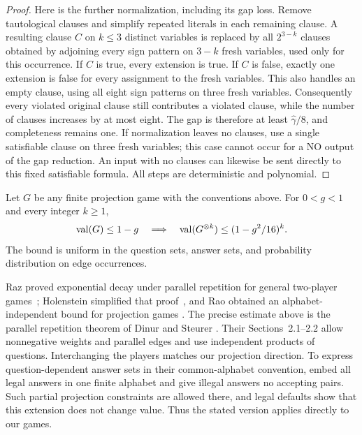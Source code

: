 \begin{proof}
Here is the further normalization, including its gap loss.  Remove
tautological clauses and simplify repeated literals in each remaining
clause.  A resulting clause $C$ on $k\leq3$ distinct variables is
replaced by all $2^{3-k}$ clauses obtained by adjoining every sign
pattern on $3-k$ fresh variables, used only for this occurrence.  If
$C$ is true, every extension is true.  If $C$ is false, exactly one
extension is false for every assignment to the fresh variables.
This also handles an empty clause, using all eight sign patterns on
three fresh variables.  Consequently every violated original clause
still contributes a violated clause, while the number of clauses
increases by at most eight.  The gap is therefore at least
$\widehat\gamma/8$, and completeness remains one.  If normalization
leaves no clauses, use a single satisfiable clause on three fresh
variables; this case cannot occur for a NO output of the gap reduction.
An input with no clauses can likewise be sent directly to this fixed
satisfiable formula.  All steps are deterministic and polynomial.
\end{proof}

\begin{theorem}
\label{thm:repetition}
Let $G$ be any finite projection game with the conventions above.
For $0<g<1$ and every integer $k\geq1$,
\begin{equation}
 \operatorname{val}(G)\leq1-g
 \quad\Longrightarrow\quad
 \operatorname{val}(G^{\otimes k})\leq(1-g^2/16)^k.
 \label{eq:prelim-repetition}
\end{equation}
The bound is uniform in the question sets, answer sets, and probability
distribution on edge occurrences.
\end{theorem}

Raz proved exponential decay under parallel repetition for general two-player
games~\cite{Raz1998}; Holenstein simplified that proof~\cite{Holenstein2009},
and Rao obtained an alphabet-independent bound for projection games
\cite{Rao2011}.  The precise estimate above is the parallel repetition theorem
of Dinur and Steurer
\cite[Corollary~1.2]{DinurSteurer2014}.  Their Sections~2.1--2.2
allow nonnegative weights and parallel edges and use independent
products of questions.  Interchanging the players matches our
projection direction.  To express question-dependent answer sets in
their common-alphabet convention, embed all legal answers in one
finite alphabet and give illegal answers no accepting pairs.  Such
partial projection constraints are allowed there, and legal defaults
show that this extension does not change value.  Thus the stated
version applies directly to our games.

